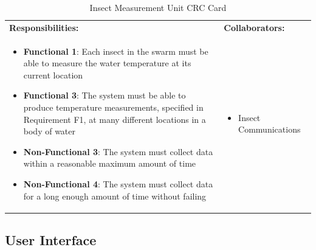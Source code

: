 \documentclass[11pt]{article}
\begin{document}
\begin{table}[H]
\centering
\label{my-label}
\begin{tabular}{ | >{\raggedright\arraybackslash}p{} | >{\raggedright\arraybackslash}p{} | }
\hline
\multicolumn{2}{|c|}{\textbf{Hydroswarm}}             \\ \hline
\textbf{Responsibilities:} & \textbf{Collaborators:} \\ \hline
\begin{itemize}
\item \textbf{Functional 1}: Each insect in the swarm must be able to measure the water temperature at its current location
\item \textbf{Functional 3}: The system must be able to produce temperature measurements, specified in Requirement F1, at many different locations in a body of water
\item \textbf{Non-Functional 3}: The system must collect data within a reasonable maximum amount of time
\item \textbf{Non-Functional 4}: The system must collect data for a long enough amount of time without failing
\end{itemize}
&
\begin{itemize}
\item Insect Communications
\end{itemize} \\ \hline
\end{tabular}
\caption{Insect Measurement Unit CRC Card}
\end{table}

\subsection{User Interface}
\end{document}

